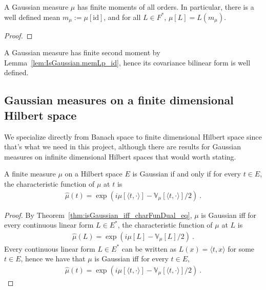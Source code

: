 \begin{lemma}\label{lem:IsGaussian.memLp_id}
  \mathlibok
A Gaussian measure $\mu$ has finite moments of all orders.
In particular, there is a well defined mean $m_\mu := \mu[\mathrm{id}]$, and for all $L \in F^*$, $\mu[L] = L(m_\mu)$.
\end{lemma}

\begin{proof}  

\end{proof}

A Gaussian measure has finite second moment by Lemma~\ref{lem:IsGaussian.memLp_id}, hence its covariance bilinear form is well defined.


\subsection{Gaussian measures on a finite dimensional Hilbert space}

We specialize directly from Banach space to finite dimensional Hilbert space since that's what we need in this project, although there are results for Gaussian measures on infinite dimensional Hilbert spaces that would worth stating.

\begin{lemma}\label{lem:isGaussian_iff_charFun_eq}
A finite measure $\mu$ on a Hilbert space $E$ is Gaussian if and only if for every $t \in E$, the characteristic function of $\mu$ at $t$ is
\begin{align*}
  \hat{\mu}(t) =  \exp\left(i \mu[\langle t, \cdot \rangle] - \mathbb{V}_\mu[\langle t, \cdot \rangle] / 2\right) \: .
\end{align*}
\end{lemma}

\begin{proof}  
By Theorem~\ref{thm:isGaussian_iff_charFunDual_eq}, $\mu$ is Gaussian iff for every continuous linear form $L \in E^*$, the characteristic function of $\mu$ at $L$ is
\begin{align*}
  \hat{\mu}(L) = \exp\left(i \mu[L] - \mathbb{V}_\mu[L] / 2\right) \: .
\end{align*}
Every continuous linear form $L \in E^*$ can be written as $L(x) = \langle t, x \rangle$ for some $t \in E$, hence we have that $\mu$ is Gaussian iff for every $t \in E$,
\begin{align*}
  \hat{\mu}(t) = \exp\left(i \mu[\langle t, \cdot \rangle] - \mathbb{V}_\mu[\langle t, \cdot \rangle] / 2\right) \: .
\end{align*}
\end{proof}

